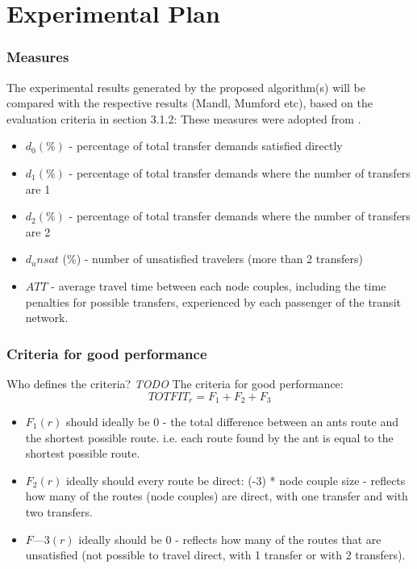 \section{Experimental Plan}

\subsubsection{Measures}
The experimental results generated by the proposed algorithm(s) will be compared with the respective results (Mandl, Mumford etc), based on the evaluation criteria in section 3.1.2: 
These measures were adopted from \citet{kechagiopoulos14}.

\begin{itemize}
\item $d_0 (\%)$ - percentage of total transfer demands satisfied directly
\item $d_1 (\%)$ - percentage of total transfer demands where the number of transfers are 1
\item $d_2 (\%)$ - percentage of total transfer demands where the number of transfers are 2
\item $d_unsat$ (\%) - number of unsatisfied travelers (more than 2 transfers)
\item $ATT$  - average travel time between each node couples, including the time penalties for possible transfers, experienced by each passenger of the transit network.
\end{itemize}

\subsubsection{Criteria for good performance}
Who defines the criteria?\emph{\color{red} TODO}
The criteria for good performance:
$$TOTFIT_{r} = F_{1} + F_{2} + F_{3}$$
\begin{itemize}
\item $F_{1}(r)$ should ideally be 0 -  the total difference between an ants route and the shortest possible route. i.e. each route found by the ant is equal to the shortest possible route.
\item $F_{2}(r)$ ideally should every route be direct: (-3) * node couple size - reflects how many of the routes (node couples) are direct, with one transfer and with two transfers.  
\item $F—{3}(r)$ ideally should be 0 - reflects how many of the routes that are unsatisfied (not possible to travel direct, with 1 transfer or with 2 transfers). 
\end{itemize}

